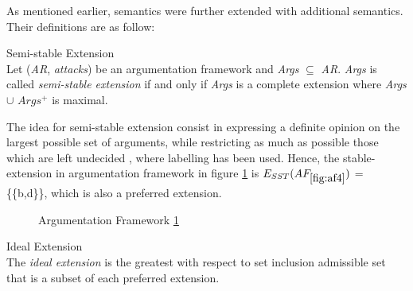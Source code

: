 As mentioned earlier, \citet{dung1995} semantics were further extended with additional semantics. Their definitions are as follow: 

\begin{definition}{Semi-stable Extension}
\label{def:semiStableExtension}\\
Let (\textit{AR}, \textit{attacks}) be an argumentation framework and \textit{Args} $\subseteq$ \textit{AR}. \textit{Args} is called \textit{semi-stable extension} if and only if \textit{Args} is a complete extension where \textit{Args} $\cup$ \textit{$Args^+$} is maximal.
\end{definition}

The idea for semi-stable extension consist in expressing a definite opinion on the largest possible set of arguments, while restricting as much as possible those which are left undecided \citep{baroni2011introduction}, where labelling has been used. Hence, the stable-extension in argumentation framework in figure \ref{fig:af4} is \textit{$E_{SST}(AF_{\ref{fig:af4}})$} = \{\{b,d\}\}, which is also a preferred extension.

\begin{figure}[h]
\centering
{}
\caption{Argumentation Framework \ref{fig:af4}}
\label{fig:af4}
\end{figure}

\begin{definition}{Ideal Extension}
\label{def:idealExtension}\\
The \textit{ideal extension} is the greatest with respect to set inclusion admissible set that is a subset of each preferred extension.
\end{definition}


